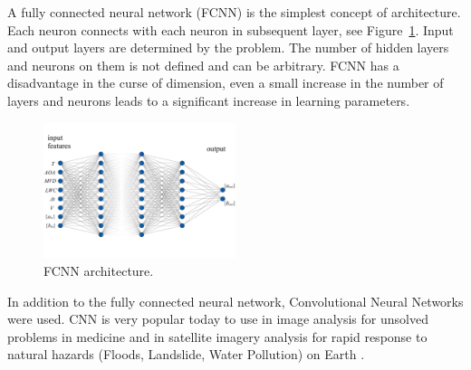 \documentclass[aerospace,article,submit,moreauthors,pdftex]{Definitions/mdpi}
\begin{document}
A fully connected neural network (FCNN) is the simplest concept of architecture. Each neuron connects with each neuron in subsequent layer, see Figure~\ref{fig:denseScheme}. Input and output layers are determined by the problem. The number of hidden layers and neurons on them is not defined and can be arbitrary. FCNN has a disadvantage in the curse of dimension, even a small increase in the number of layers and neurons leads to a significant increase in learning parameters. 

\begin{figure}[H]
\centering
\includegraphics[width=0.5\textwidth]{Figures/denseScheme.pdf}
\caption{FCNN architecture.\label{fig:denseScheme}}
\end{figure}  

In addition to the fully connected neural network, Convolutional Neural Networks were used. CNN is very popular today to use in image analysis for unsolved problems in medicine and in satellite imagery analysis for rapid response to natural hazards (Floods, Landslide, Water Pollution) on Earth  \cite{RonnebergerFischerBrox2015,BullockBofarull2019,NemniBullockBelabbesBromley2020}.

%

\end{document}
